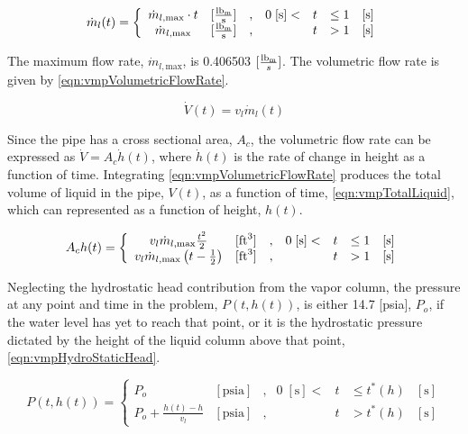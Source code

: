 \begin{equation}
\label{eqn:vmpMassFlowRate}
\dot{m}_{l}(t) = \left\{
\begin{array}{cclrcll}
 \dot{m}_{l,\text{max}}\cdot t & [\frac{ \lbm{} }{\text{s}}] & , & 0\; [\text{s}] < & t & \leq 1 & [\text{s}] \\
 \dot{m}_{l,\text{max}}        & [\frac{ \lbm{} }{\text{s}}] & , &                  & t & > 1    & [\text{s}]
\end{array}\right.
\end{equation}

The maximum flow rate, $\dot{m}_{l,\text{max}}$, is 0.406503 $ [ \frac{\lbm{}}{s} ]$.
The volumetric flow rate is given by \eqref{eqn:vmpVolumetricFlowRate}.

\begin{equation}
\label{eqn:vmpVolumetricFlowRate}
\dot{V}(t) = v_{l} \dot{m}_{l}(t)
\end{equation}

Since the pipe has a cross sectional area, $A_{c}$, the volumetric flow rate can be expressed as $\dot{V} = A_{c} \dot{h}(t)$, where $\dot{h}(t)$ is the rate of change in height as a function of time.
Integrating \eqref{eqn:vmpVolumetricFlowRate} produces the total volume of liquid in the pipe, $V(t)$, as a function of time, \eqref{eqn:vmpTotalLiquid}, which can represented as a function of height, $h(t)$.

\begin{equation}
\label{eqn:vmpTotalLiquid}
A_{c} h(t) = 
 \left\{
\begin{array}{cclrcll}
v_{l} \dot{m}_{l,\text{max}}\frac{t^{2}}{2} & [ \text{ft}^{3} ] & , & 0\; [\text{s}] < & t & \leq 1 & [\text{s}] \\
v_{l} \dot{m}_{l,\text{max}} \left( t - \onehalf  \right) & [ \text{ft}^{3} ] & , &                  & t & > 1    & [\text{s}]
\end{array}\right.
\end{equation}

Neglecting the hydrostatic head contribution from the vapor column, the pressure at any point and time in the problem, $P(t, h(t))$, is either 14.7 [psia], $P_o$, if the water level has yet to reach that point, or it is the hydrostatic pressure dictated by the height of the liquid column above that point, \eqref{eqn:vmpHydroStaticHead}.

\begin{equation}
\label{eqn:vmpHydroStaticHead}
P(t, h(t))= 
 \left\{
\begin{array}{cclrcll}
P_o & [ \text{psia} ] & , & 0\; [\text{s}] < & t & \leq t^{*}(h) & [\text{s}] \\
P_o + \frac{ h(t) - h }{ v_{l} } & [ \text{psia} ] & , &  & t & > t^{*}(h) & [\text{s}]
\end{array}\right.
\end{equation}

